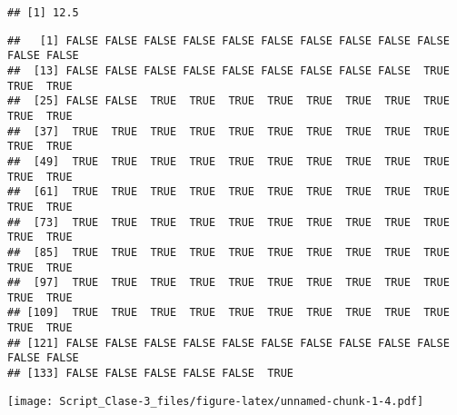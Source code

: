 \documentclass[
]{article}
\newenvironment{Shaded}{\begin{snugshade}}{\end{snugshade}}
\newcommand{\CommentTok}[1]{\textcolor[rgb]{0.56,0.35,0.01}{\textit{#1}}}
\newcommand{\DecValTok}[1]{\textcolor[rgb]{0.00,0.00,0.81}{#1}}
\newcommand{\DocumentationTok}[1]{\textcolor[rgb]{0.56,0.35,0.01}{\textbf{\textit{#1}}}}
\newcommand{\FunctionTok}[1]{\textcolor[rgb]{0.13,0.29,0.53}{\textbf{#1}}}
\newcommand{\NormalTok}[1]{#1}
\newcommand{\OtherTok}[1]{\textcolor[rgb]{0.56,0.35,0.01}{#1}}
\newcommand{\SpecialCharTok}[1]{\textcolor[rgb]{0.81,0.36,0.00}{\textbf{#1}}}
\begin{document}
\begin{verbatim}
## [1] 12.5
\end{verbatim}

\begin{Shaded}
\end{Shaded}

\begin{verbatim}
##   [1] FALSE FALSE FALSE FALSE FALSE FALSE FALSE FALSE FALSE FALSE FALSE FALSE
##  [13] FALSE FALSE FALSE FALSE FALSE FALSE FALSE FALSE FALSE  TRUE  TRUE  TRUE
##  [25] FALSE FALSE  TRUE  TRUE  TRUE  TRUE  TRUE  TRUE  TRUE  TRUE  TRUE  TRUE
##  [37]  TRUE  TRUE  TRUE  TRUE  TRUE  TRUE  TRUE  TRUE  TRUE  TRUE  TRUE  TRUE
##  [49]  TRUE  TRUE  TRUE  TRUE  TRUE  TRUE  TRUE  TRUE  TRUE  TRUE  TRUE  TRUE
##  [61]  TRUE  TRUE  TRUE  TRUE  TRUE  TRUE  TRUE  TRUE  TRUE  TRUE  TRUE  TRUE
##  [73]  TRUE  TRUE  TRUE  TRUE  TRUE  TRUE  TRUE  TRUE  TRUE  TRUE  TRUE  TRUE
##  [85]  TRUE  TRUE  TRUE  TRUE  TRUE  TRUE  TRUE  TRUE  TRUE  TRUE  TRUE  TRUE
##  [97]  TRUE  TRUE  TRUE  TRUE  TRUE  TRUE  TRUE  TRUE  TRUE  TRUE  TRUE  TRUE
## [109]  TRUE  TRUE  TRUE  TRUE  TRUE  TRUE  TRUE  TRUE  TRUE  TRUE  TRUE  TRUE
## [121] FALSE FALSE FALSE FALSE FALSE FALSE FALSE FALSE FALSE FALSE FALSE FALSE
## [133] FALSE FALSE FALSE FALSE FALSE  TRUE
\end{verbatim}

\begin{Shaded}
\end{Shaded}

\texttt{[image: Script\_Clase-3\_files/figure-latex/unnamed-chunk-1-4.pdf]}
\end{document}
